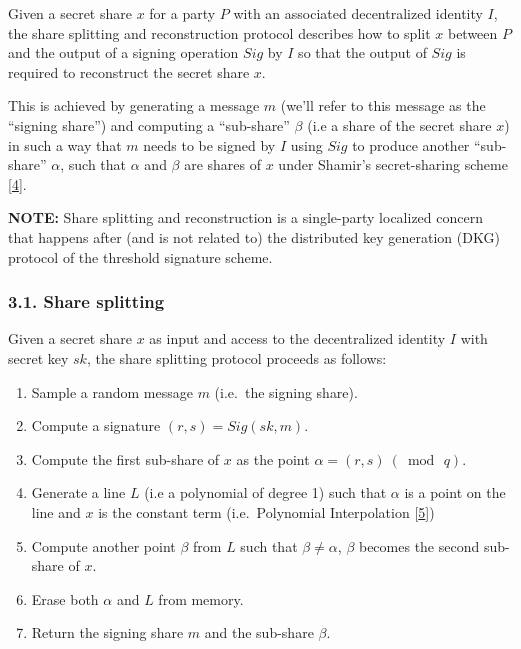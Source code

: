\documentclass[
]{article}
\providecommand{\tightlist}{%
  \setlength{\itemsep}{0pt}\setlength{\parskip}{0pt}}
\begin{document}
Given a secret share \(x\) for a party \(P\) with an associated
decentralized identity \(I\), the share splitting and reconstruction
protocol describes how to split \(x\) between \(P\) and the output of a
signing operation \(Sig\) by \(I\) so that the output of \(Sig\) is
required to reconstruct the secret share \(x\).

This is achieved by generating a message \(m\) (we'll refer to this
message as the ``signing share'') and computing a ``sub-share''
\(\beta\) (i.e a share of the secret share \(x\)) in such a way that
\(m\) needs to be signed by \(I\) using \(Sig\) to produce another
``sub-share'' \(\alpha\), such that \(\alpha\) and \(\beta\) are shares
of \(x\) under Shamir's secret-sharing scheme
{[}\protect\hyperlink{ref-sss79}{4}{]}.

\textbf{NOTE:} Share splitting and reconstruction is a single-party
localized concern that happens after (and is not related to) the
distributed key generation (DKG) protocol of the threshold signature
scheme.

\hypertarget{share-splitting}{%
\subsubsection{3.1. Share splitting}\label{share-splitting}}

Given a secret share \(x\) as input and access to the decentralized
identity \(I\) with secret key \(sk\), the share splitting protocol
proceeds as follows:

\begin{enumerate}
\def\labelenumi{\arabic{enumi}.}
\tightlist
\item
  Sample a random message \(m\) (i.e.~the signing share).
\item
  Compute a signature \((r, s) = Sig(sk, m)\).
\item
  Compute the first sub-share of \(x\) as the point
  \(\alpha = (r, s) \: (\bmod \, q)\).
\item
  Generate a line \(L\) (i.e a polynomial of degree 1) such that
  \(\alpha\) is a point on the line and \(x\) is the constant term
  (i.e.~Polynomial Interpolation
  {[}\protect\hyperlink{ref-wiki:interpolation}{5}{]})
\item
  Compute another point \(\beta\) from \(L\) such that
  \(\beta \neq \alpha\), \(\beta\) becomes the second sub-share of
  \(x\).
\item
  Erase both \(\alpha\) and \(L\) from memory.
\item
  Return the signing share \(m\) and the sub-share \(\beta\).
\end{enumerate}
\end{document}
